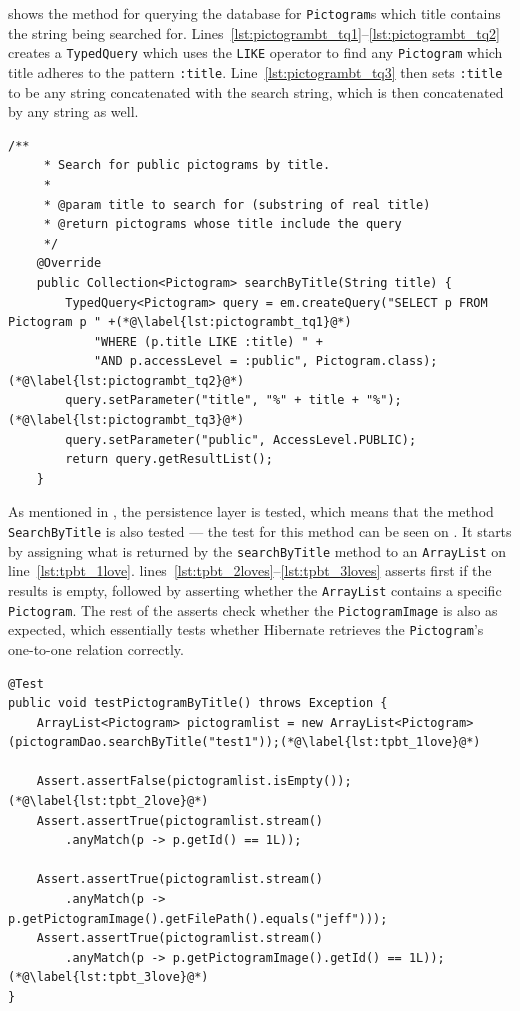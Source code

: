 \bigskip
{} shows the method for querying the database for \texttt{Pictogram}s which title contains the string being searched for.
Lines~\ref{lst:pictogrambt_tq1}--\ref{lst:pictogrambt_tq2} creates a \texttt{TypedQuery} which uses the \texttt{LIKE} operator to find any \texttt{Pictogram} which title adheres to the pattern \texttt{:title}.
Line~\ref{lst:pictogrambt_tq3} then sets \texttt{:title} to be any string concatenated with the search string, which is then concatenated by any string as well.
\begin{lstlisting}[float, floatplacement=h, caption={The method which searches through all \texttt{Pictogram}s by their titles.},label={lst:pictogramByTitle}]
    /**
     * Search for public pictograms by title.
     *
     * @param title to search for (substring of real title)
     * @return pictograms whose title include the query
     */
    @Override
    public Collection<Pictogram> searchByTitle(String title) {
        TypedQuery<Pictogram> query = em.createQuery("SELECT p FROM Pictogram p " +(*@\label{lst:pictogrambt_tq1}@*)
            "WHERE (p.title LIKE :title) " +
            "AND p.accessLevel = :public", Pictogram.class);(*@\label{lst:pictogrambt_tq2}@*)
        query.setParameter("title", "%" + title + "%");(*@\label{lst:pictogrambt_tq3}@*)
        query.setParameter("public", AccessLevel.PUBLIC);
        return query.getResultList();
    }
\end{lstlisting}

As mentioned in , the persistence layer is tested, which means that the method \texttt{SearchByTitle} is also tested --- the test for this method can be seen on .
It starts by assigning what is returned by the \texttt{searchByTitle} method to an \texttt{ArrayList} on line~\ref{lst:tpbt_1love}.
lines~\ref{lst:tpbt_2loves}--\ref{lst:tpbt_3loves} asserts first if the results is empty, followed by asserting whether the \texttt{ArrayList} contains a specific \texttt{Pictogram}.
The rest of the asserts check whether the \texttt{PictogramImage} is also as expected, which essentially tests whether Hibernate retrieves the \texttt{Pictogram}'s one-to-one relation correctly.

\begin{lstlisting}[float, floatplacement=h, caption={The test method which tests the method \texttt{SearchByTitle}.},label={lst:pictogramByTitleTest}]
@Test
public void testPictogramByTitle() throws Exception {
    ArrayList<Pictogram> pictogramlist = new ArrayList<Pictogram>(pictogramDao.searchByTitle("test1"));(*@\label{lst:tpbt_1love}@*)

    Assert.assertFalse(pictogramlist.isEmpty());(*@\label{lst:tpbt_2love}@*)
    Assert.assertTrue(pictogramlist.stream()
    	.anyMatch(p -> p.getId() == 1L));

    Assert.assertTrue(pictogramlist.stream()
    	.anyMatch(p -> p.getPictogramImage().getFilePath().equals("jeff")));
    Assert.assertTrue(pictogramlist.stream()
    	.anyMatch(p -> p.getPictogramImage().getId() == 1L));(*@\label{lst:tpbt_3love}@*)
}
\end{lstlisting}

